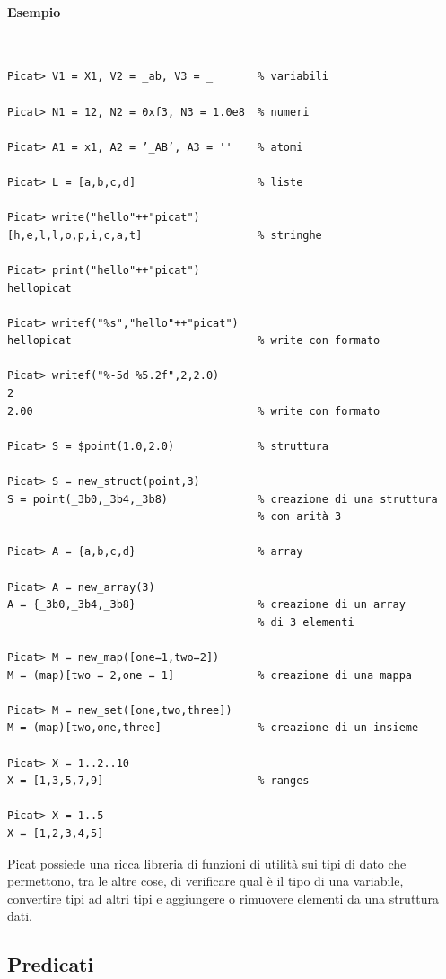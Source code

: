 \documentclass[12pt,a4paper,openright]{book}  %
\begin{document}
\paragraph{Esempio}\
\begin{verbatim}
Picat> V1 = X1, V2 = _ab, V3 = _       % variabili

Picat> N1 = 12, N2 = 0xf3, N3 = 1.0e8  % numeri

Picat> A1 = x1, A2 = ’_AB’, A3 = ''    % atomi

Picat> L = [a,b,c,d]                   % liste

Picat> write("hello"++"picat")
[h,e,l,l,o,p,i,c,a,t]                  % stringhe

Picat> print("hello"++"picat")
hellopicat

Picat> writef("%s","hello"++"picat")
hellopicat                             % write con formato

Picat> writef("%-5d %5.2f",2,2.0)
2
2.00                                   % write con formato

Picat> S = $point(1.0,2.0)             % struttura

Picat> S = new_struct(point,3)
S = point(_3b0,_3b4,_3b8)              % creazione di una struttura
                                       % con arità 3

Picat> A = {a,b,c,d}                   % array

Picat> A = new_array(3)
A = {_3b0,_3b4,_3b8}                   % creazione di un array 
                                       % di 3 elementi

Picat> M = new_map([one=1,two=2])
M = (map)[two = 2,one = 1]             % creazione di una mappa

Picat> M = new_set([one,two,three])
M = (map)[two,one,three]               % creazione di un insieme

Picat> X = 1..2..10
X = [1,3,5,7,9]                        % ranges

Picat> X = 1..5
X = [1,2,3,4,5]
\end{verbatim}

Picat possiede una ricca libreria di funzioni di utilità sui tipi di
dato che permettono, tra le altre cose, di verificare qual è il tipo
di una variabile, convertire tipi ad altri tipi e aggiungere o
rimuovere elementi da una struttura dati.

\subsection{Predicati}
\label{subsec:picat_base_pred}
\end{document}
